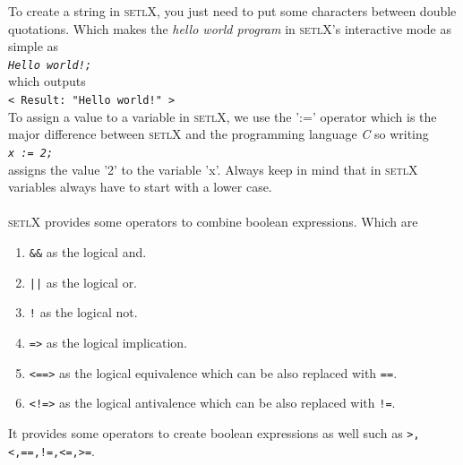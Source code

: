 \documentclass[11pt]{report}
\begin{document}
To create a string in \textsc{setlX}, you just need to put some characters between double quotations. Which makes the \textsl{hello world program} in \textsc{setlX}'s interactive mode as simple as
\\[0.2cm]
\hspace*{1.3cm}
\texttt{\textsl{Hello world!;}}
\\[0.2cm]
which outputs 
\\[0.2cm]
\hspace*{1.3cm}
\texttt{< Result: "Hello world!" >}
\texttt{}
\\[0.2cm]

To assign a value to a variable in \textsc{setlX}, we use the ':=' operator which is the major difference between \textsc{setlX} and the programming language \textsl{C}
so writing 
\\[0.2cm]
\hspace*{1.3cm}
\texttt{\textsl{x := 2;}}
\\[0.2cm]
assigns the value '2' to the variable 'x'. Always keep in mind that in \textsc{setlX} variables always have to start with a lower case.
\\
\\
\textsc{setlX} provides some operators to combine boolean expressions. Which are
\begin{enumerate}
\item \texttt{\&\&} as the logical and.
\item \texttt{||} as the logical or.
\item \texttt{!} as the logical not.
\item \texttt{=>} as the logical implication.
\item \texttt{<==>} as the logical equivalence which can be also replaced with \texttt{==}.
\item \texttt{<!=>} as the logical antivalence which can be also replaced with \texttt{!=}.
\end{enumerate}
It provides some operators to create boolean expressions as well such as \texttt{>,<,==,!=,<=,>=}.
\end{document}
